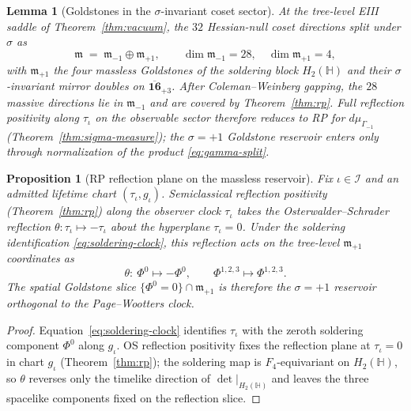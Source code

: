 \documentclass[aps,prd,onecolumn,amsmath,amssymb,nofootinbib,11pt]{revtex4-2}
\numberwithin{equation}{section}
\theoremstyle{plain}
\newtheorem{lemma}[theorem]{Lemma}
\newtheorem{proposition}[theorem]{Proposition}
\theoremstyle{definition}
\theoremstyle{remark}
\newcommand{\Quat}{\mathbb{H}}
\newcommand{\orderparam}{\Phi}
\begin{document}
\begin{lemma}[Goldstones in the $\sigma$-invariant coset sector]
\label{lem:goldstone-sigma}
At the tree-level EIII saddle of Theorem~\ref{thm:vacuum}, the $32$
Hessian-null coset directions split under $\sigma$ as
\begin{equation}\label{eq:goldstone-split}
  \mathfrak{m}
  \;=\;
  \mathfrak{m}_{-1}\oplus\mathfrak{m}_{+1},
  \qquad
  \dim\mathfrak{m}_{-1}=28,\quad \dim\mathfrak{m}_{+1}=4,
\end{equation}
with $\mathfrak{m}_{+1}$ the four massless Goldstones of the soldering block
$H_2(\Quat)$ and their $\sigma$-invariant mirror doubles on
$\overline{\mathbf{16}}_{+3}$. After Coleman--Weinberg gapping, the
$28$ massive directions lie in $\mathfrak{m}_{-1}$ and are covered by
Theorem~\ref{thm:rp}. Full reflection positivity along $\tau_\iota$ on the
\emph{observable} sector therefore reduces to RP for $d\mu_{\Gamma_{-1}}$
(Theorem~\ref{thm:sigma-measure}); the $\sigma=+1$ Goldstone reservoir
enters only through normalization of the product \eqref{eq:gamma-split}.
\end{lemma}

\begin{proposition}[RP reflection plane on the massless reservoir]
\label{prop:goldstone-rp-plane}
Fix $\iota\in\mathcal{I}$ and an admitted lifetime chart
$(\tau_\iota,g_\iota)$. Semiclassical reflection positivity (Theorem~\ref{thm:rp}) along the observer clock
$\tau_\iota$ takes the Osterwalder--Schrader reflection
$\theta:\tau_\iota\mapsto-\tau_\iota$ about the hyperplane $\tau_\iota=0$.
Under the soldering identification \eqref{eq:soldering-clock}, this
reflection acts on the tree-level $\mathfrak{m}_{+1}$ coordinates as
\begin{equation}\label{eq:goldstone-reflection}
  \theta:\ \orderparam^0\mapsto-\orderparam^0,
  \qquad
  \orderparam^{1,2,3}\mapsto\orderparam^{1,2,3}.
\end{equation}
The spatial Goldstone slice
$\{\orderparam^0=0\}\cap\mathfrak{m}_{+1}$ is therefore the
$\sigma=+1$ reservoir orthogonal to the Page--Wootters clock.
\end{proposition}

\begin{proof}
Equation~\eqref{eq:soldering-clock} identifies $\tau_\iota$ with the
zeroth soldering component $\orderparam^0$ along $g_\iota$. OS reflection
positivity fixes the reflection plane at $\tau_\iota=0$ in chart $g_\iota$
(Theorem~\ref{thm:rp}); the soldering map is $F_4$-equivariant on
$H_2(\Quat)$, so $\theta$ reverses only the timelike direction of
$\det|_{H_2(\Quat)}$ and leaves the three spacelike components fixed on the
reflection slice.
\end{proof}
\end{document}
